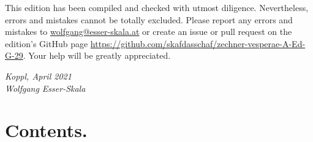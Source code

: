 \documentclass[parskip=full]{scrreprt}
\newif\iftemplate\templatetrue
\begin{document}
This edition has been compiled and checked with utmost diligence. Nevertheless, errors and mistakes cannot be totally excluded. Please report any errors and mistakes to \url{wolfgang@esser-skala.at} or create an issue or pull request on the edition’s GitHub page \url{https://github.com/skafdasschaf/zechner-vesperae-A-Ed-G-29}. Your help will be greatly appreciated.

\bigskip
\textit{Koppl,  April 2021\\
Wolfgang Esser-Skala}

\cleardoublepage
\chapter*{Contents.}


\cleardoublepage
\fi

\iftemplate

\fi
\end{document}
